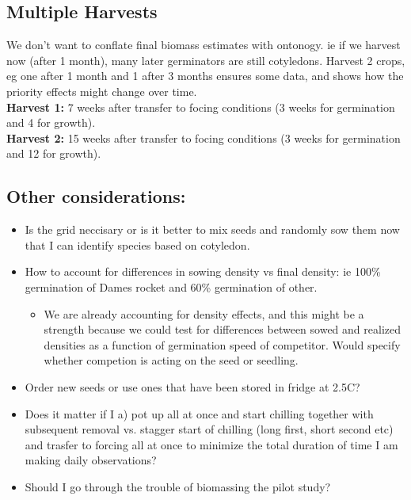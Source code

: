 \documentclass{article}\usepackage[]{graphicx}\usepackage[]{color}
\begin{document}
\subsection{Multiple Harvests}
We don't want to conflate final biomass estimates with ontonogy. ie if we harvest now (after 1 month), many later germinators are still cotyledons. Harvest 2 crops, eg one after 1 month and 1 after 3 months ensures some data, and shows how the priority effects might change over time.\\
\textbf{Harvest 1:} 7 weeks after transfer to focing conditions (3 weeks for germination and 4 for growth).\\
\textbf{Harvest 2:} 15 weeks after transfer to focing conditions (3 weeks for germination and 12 for growth).\\

\subsection{Other considerations:}
\begin{itemize}
\item Is the grid neccisary or is it better to mix seeds and randomly sow them now that I can identify species based on cotyledon.
\item How to account for differences in sowing density vs final density: ie 100\% germination of Dames rocket and 60\% germination of other.
\begin{itemize}
\item We are already accounting for density effects, and this might be a strength because we could test for differences between sowed and realized densities as a function of germination speed of competitor. Would specify whether competion is acting on the seed or seedling.
\end{itemize}
\item Order new seeds or use ones that have been stored in fridge at 2.5\degree C?
\item Does it matter if I a) pot up all at once and start chilling together with subsequent removal vs. stagger start of chilling (long first, short second etc) and trasfer to forcing all at once to minimize the total duration of time I am making daily observations?
\item Should I go through the trouble of biomassing the pilot study?
\end{itemize}
\end{document}
